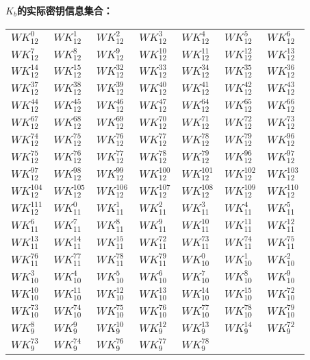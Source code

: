 \noindent
\textbf{$K_b$的实际密钥信息集合：}
\begin{table}[!h]
    \centering
\begin{tabular}{|l|l|l|l|l|l|l|}
\hline

$WK_{12}^{0}$&$WK_{12}^{1}$&$WK_{12}^{2}$&$WK_{12}^{3}$&$WK_{12}^{4}$&$WK_{12}^{5}$&$WK_{12}^{6}$\\
$WK_{12}^{7}$&$WK_{12}^{8}$&$WK_{12}^{9}$&$WK_{12}^{10}$&$WK_{12}^{11}$&$WK_{12}^{12}$&$WK_{12}^{13}$\\
$WK_{12}^{14}$&$WK_{12}^{15}$&$WK_{12}^{32}$&$WK_{12}^{33}$&$WK_{12}^{34}$&$WK_{12}^{35}$&$WK_{12}^{36}$\\
$WK_{12}^{37}$&$WK_{12}^{38}$&$WK_{12}^{39}$&$WK_{12}^{40}$&$WK_{12}^{41}$&$WK_{12}^{42}$&$WK_{12}^{43}$\\
$WK_{12}^{44}$&$WK_{12}^{45}$&$WK_{12}^{46}$&$WK_{12}^{47}$&$WK_{12}^{64}$&$WK_{12}^{65}$&$WK_{12}^{66}$\\
$WK_{12}^{67}$&$WK_{12}^{68}$&$WK_{12}^{69}$&$WK_{12}^{70}$&$WK_{12}^{71}$&$WK_{12}^{72}$&$WK_{12}^{73}$\\
$WK_{12}^{74}$&$WK_{12}^{75}$&$WK_{12}^{76}$&$WK_{12}^{77}$&$WK_{12}^{78}$&$WK_{12}^{79}$&$WK_{12}^{96}$\\
$WK_{12}^{75}$&$WK_{12}^{76}$&$WK_{12}^{77}$&$WK_{12}^{78}$&$WK_{12}^{79}$&$WK_{12}^{96}$&$WK_{12}^{97}$\\
$WK_{12}^{97}$&$WK_{12}^{98}$&$WK_{12}^{99}$&$WK_{12}^{100}$&$WK_{12}^{101}$&$WK_{12}^{102}$&$WK_{12}^{103}$\\
$WK_{12}^{104}$&$WK_{12}^{105}$&$WK_{12}^{106}$&$WK_{12}^{107}$&$WK_{12}^{108}$&$WK_{12}^{109}$&$WK_{12}^{110}$\\
$WK_{12}^{111}$&$WK_{11}^{0}$&$WK_{11}^{1}$&$WK_{11}^{2}$&$WK_{11}^{3}$&$WK_{11}^{4}$&$WK_{11}^{5}$\\
$WK_{11}^{6}$&$WK_{11}^{7}$&$WK_{11}^{8}$&$WK_{11}^{9}$&$WK_{11}^{10}$&$WK_{11}^{11}$&$WK_{11}^{12}$\\
$WK_{11}^{13}$&$WK_{11}^{14}$&$WK_{11}^{15}$&$WK_{11}^{72}$&$WK_{11}^{73}$&$WK_{11}^{74}$&$WK_{11}^{75}$\\
$WK_{11}^{76}$&$WK_{11}^{77}$&$WK_{11}^{78}$&$WK_{11}^{79}$&$WK_{10}^{0}$&$WK_{10}^{1}$&$WK_{10}^{2}$\\
$WK_{10}^{3}$&$WK_{10}^{4}$&$WK_{10}^{5}$&$WK_{10}^{6}$&$WK_{10}^{7}$&$WK_{10}^{8}$&$WK_{10}^{9}$\\
$WK_{10}^{10}$&$WK_{10}^{11}$&$WK_{10}^{12}$&$WK_{10}^{13}$&$WK_{10}^{14}$&$WK_{10}^{15}$&$WK_{10}^{72}$\\
$WK_{10}^{73}$&$WK_{10}^{74}$&$WK_{10}^{75}$&$WK_{10}^{76}$&$WK_{10}^{77}$&$WK_{10}^{78}$&$WK_{10}^{79}$\\
$WK_{9}^{8}$&$WK_{9}^{9}$&$WK_{9}^{10}$&$WK_{9}^{12}$&$WK_{9}^{13}$&$WK_{9}^{14}$&$WK_{9}^{72}$\\
$WK_{9}^{73}$&$WK_{9}^{74}$&$WK_{9}^{76}$&$WK_{9}^{77}$&$WK_{9}^{78}$&&\\
\hline
\end{tabular}
\end{table}

